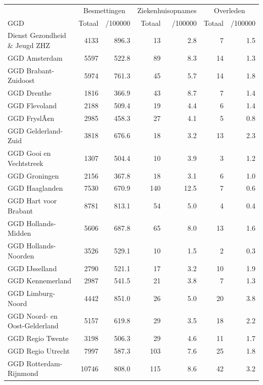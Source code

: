 \documentclass[
  english,
  man,floatsintext]{apa6}
\begin{document}
\begin{table}
\centering\begingroup\fontsize{10}{12}\selectfont

\begin{threeparttable}
\begin{tabular}{lrrrrrr}
\toprule
\multicolumn{1}{c}{ } & \multicolumn{2}{c}{Besmettingen} & \multicolumn{2}{c}{Ziekenhuisopnames} & \multicolumn{2}{c}{Overleden} \\
\cmidrule(l{3pt}r{3pt}){2-3} \cmidrule(l{3pt}r{3pt}){4-5} \cmidrule(l{3pt}r{3pt}){6-7}
GGD & Totaal & /100000 & Totaal & /100000 & Totaal & /100000\\
\midrule
Dienst Gezondheid \& Jeugd ZHZ & 4133 & 896.3 & 13 & 2.8 & 7 & 1.5\\
GGD Amsterdam & 5597 & 522.8 & 89 & 8.3 & 14 & 1.3\\
GGD Brabant-Zuidoost & 5974 & 761.3 & 45 & 5.7 & 14 & 1.8\\
GGD Drenthe & 1816 & 366.9 & 43 & 8.7 & 7 & 1.4\\
GGD Flevoland & 2188 & 509.4 & 19 & 4.4 & 6 & 1.4\\
GGD FryslÃ¢n & 2985 & 458.3 & 27 & 4.1 & 5 & 0.8\\
GGD Gelderland-Zuid & 3818 & 676.6 & 18 & 3.2 & 13 & 2.3\\
GGD Gooi en Vechtstreek & 1307 & 504.4 & 10 & 3.9 & 3 & 1.2\\
GGD Groningen & 2156 & 367.8 & 18 & 3.1 & 6 & 1.0\\
GGD Haaglanden & 7530 & 670.9 & 140 & 12.5 & 7 & 0.6\\
GGD Hart voor Brabant & 8781 & 813.1 & 54 & 5.0 & 4 & 0.4\\
GGD Hollands-Midden & 5606 & 687.8 & 65 & 8.0 & 13 & 1.6\\
GGD Hollands-Noorden & 3526 & 529.1 & 10 & 1.5 & 2 & 0.3\\
GGD IJsselland & 2790 & 521.1 & 17 & 3.2 & 10 & 1.9\\
GGD Kennemerland & 2987 & 541.5 & 21 & 3.8 & 7 & 1.3\\
GGD Limburg-Noord & 4442 & 851.0 & 26 & 5.0 & 20 & 3.8\\
GGD Noord- en Oost-Gelderland & 5157 & 619.8 & 29 & 3.5 & 18 & 2.2\\
GGD Regio Twente & 3198 & 506.3 & 29 & 4.6 & 11 & 1.7\\
GGD Regio Utrecht & 7997 & 587.3 & 103 & 7.6 & 25 & 1.8\\
GGD Rotterdam-Rijnmond & 10746 & 808.0 & 115 & 8.6 & 42 & 3.2\\

\end{tabular}
\end{threeparttable}
\end{table}
\end{document}
